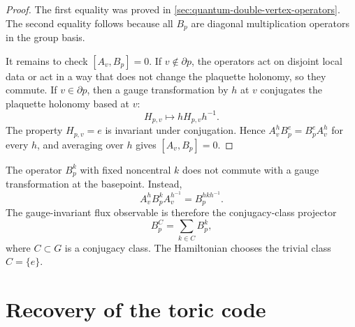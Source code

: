\begin{proof}
The first equality was proved in \cref{sec:quantum-double-vertex-operators}.  The
second equality follows because all \(B_p\) are diagonal multiplication
operators in the group basis.

It remains to check \([A_v,B_p]=0\).  If \(v\notin\partial p\), the operators act
on disjoint local data or act in a way that does not change the plaquette
holonomy, so they commute.  If \(v\in\partial p\), then a gauge transformation by
\(h\) at \(v\) conjugates the plaquette holonomy based at \(v\):
\begin{equation}
\label{eq:holonomy-conjugation-under-gauge-transform}
    H_{p,v}\longmapsto hH_{p,v}h^{-1} .
\end{equation}
The property \(H_{p,v}=e\) is invariant under conjugation.  Hence
\(A_v^hB_p^e=B_p^eA_v^h\) for every \(h\), and averaging over \(h\) gives
\([A_v,B_p]=0\).
\end{proof}

\begin{remark}
The operator \(B_p^k\) with fixed noncentral \(k\) does not commute with a gauge
transformation at the basepoint.  Instead,
\begin{equation}
\label{eq:flux-projector-conjugation}
    A_v^h B_p^k A_v^{h^{-1}}=B_p^{hkh^{-1}} .
\end{equation}
The gauge-invariant flux observable is therefore the conjugacy-class projector
\begin{equation}
\label{eq:conjugacy-class-flux-projector}
    B_p^C=\sum_{k\in C}B_p^k,
\end{equation}
where \(C\subset G\) is a conjugacy class.  The Hamiltonian chooses the trivial
class \(C=\{e\}\).
\end{remark}

\section{Recovery of the toric code}
\label{sec:quantum-double-recovers-toric-code}

